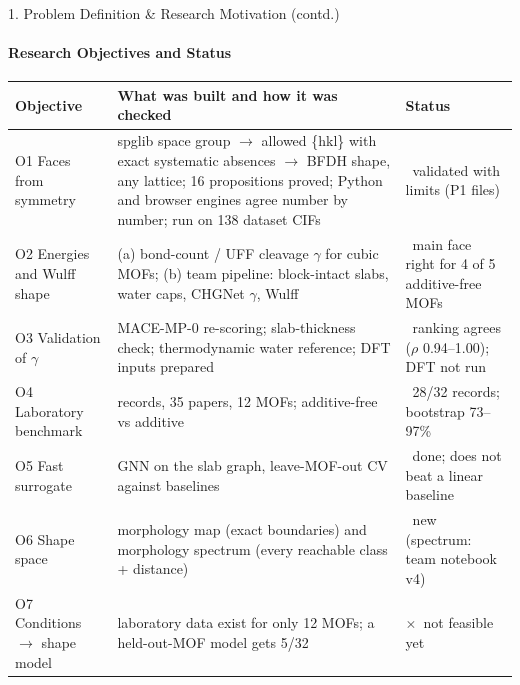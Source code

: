 \documentclass[aspectratio=169, 11pt]{beamer}
\newcommand{\ok}{\textcolor{doneGreen}{\checkmark}}
\newcommand{\no}{\textcolor{amritaMaroon}{$\times$}}
\begin{document}
\begin{frame}[shrink=6]{1. Problem Definition \& Research Motivation (contd.)}
    \framesubtitle{Research Objectives and Status}
    \scriptsize
    \renewcommand{\arraystretch}{1.25}
    \begin{tabular}{>{\raggedright\arraybackslash}p{3.3cm} >{\raggedright\arraybackslash}p{8.1cm} >{\raggedright\arraybackslash}p{2.6cm}}
        \toprule
        \textbf{Objective} & \textbf{What was built and how it was checked} & \textbf{Status} \\
        \midrule
        O1 Faces from symmetry & spglib space group $\rightarrow$ allowed \{hkl\} with exact systematic absences $\rightarrow$ BFDH shape, any lattice; 16 propositions proved; Python and browser engines agree number by number; run on 138 dataset CIFs & \ok\ validated with limits (P1 files) \\
        O2 Energies and Wulff shape & (a) bond-count / UFF cleavage $\gamma$ for cubic MOFs; (b) team pipeline: block-intact slabs, water caps, CHGNet $\gamma$, Wulff & \ok\ main face right for 4 of 5 additive-free MOFs \\
        O3 Validation of $\gamma$ & MACE-MP-0 re-scoring; slab-thickness check; thermodynamic water reference; DFT inputs prepared & \ok\ ranking agrees ($\rho$ 0.94--1.00); DFT not run \\
        O4 Laboratory benchmark & 134 records, 35 papers, 12 MOFs; additive-free vs additive & \ok\ 28/32 records; bootstrap 73--97\% \\
        O5 Fast surrogate & GNN on the slab graph, leave-MOF-out CV against baselines & \ok\ done; does not beat a linear baseline \\
        O6 Shape space & morphology map (exact boundaries) and morphology spectrum (every reachable class + distance) & \ok\ new (spectrum: team notebook v4) \\
        O7 Conditions $\rightarrow$ shape model & laboratory data exist for only 12 MOFs; a held-out-MOF model gets 5/32 & \no\ not feasible yet \\
        \bottomrule
    \end{tabular}
\end{frame}
\end{document}
